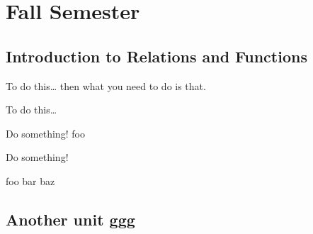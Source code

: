 \documentclass[letterpaper]{memoir}
\begin{document}
\pagestyle{myPagestyle}
\checkandfixthelayout




%
%

\part{Fall Semester}
\chapter{Introduction to Relations and Functions} 

\begin{myObjectives}
\end{myObjectives}

\begin{myVocabulary}
\end{myVocabulary}

\begin{myConcept}{To do this\dots}
    then what you need to do is that.
\end{myConcept}

\begin{myConceptSteps}{To do this\dots}
\end{myConceptSteps}

\begin{myExample}{Do something!}
    foo
\end{myExample}

\begin{myExample}{Do something!}
    \vspace{.05in}
\end{myExample}


foo bar baz


\chapter{Another unit ggg}
\end{document}
